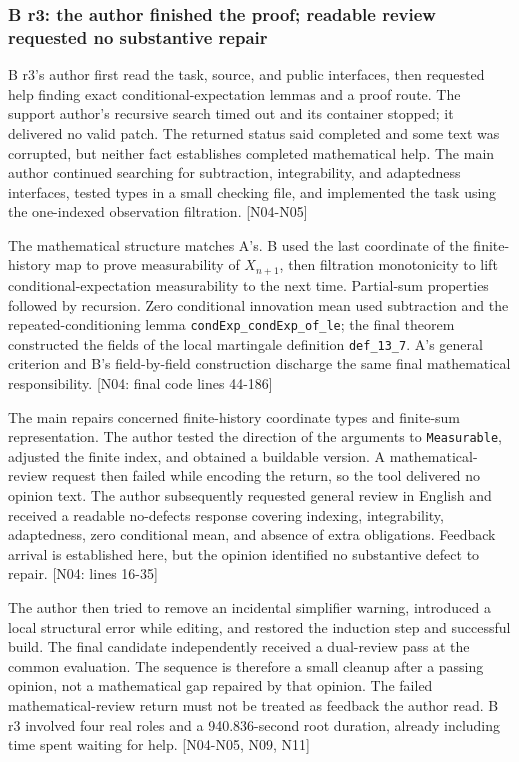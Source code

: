 \subsubsection[B r3: the author finished the proof; readable review requested no substantive repair]{\texorpdfstring{\protect\hypertarget{g9-1}{}B r3: the author finished the proof; readable review requested no substantive repair}{B r3: the author finished the proof; readable review requested no substantive repair}}
B r3's author first read the task, source, and public interfaces, then requested help finding exact conditional-expectation lemmas and a proof route. The support author's recursive search timed out and its container stopped; it delivered no valid patch. The returned status said completed and some text was corrupted, but neither fact establishes completed mathematical help. The main author continued searching for subtraction, integrability, and adaptedness interfaces, tested types in a small checking file, and implemented the task using the one-indexed observation filtration. [N04-N05]

The mathematical structure matches A's. B used the last coordinate of the finite-history map to prove measurability of $X_{n+1}$, then filtration monotonicity to lift conditional-expectation measurability to the next time. Partial-sum properties followed by recursion. Zero conditional innovation mean used subtraction and the repeated-conditioning lemma \nolinkurl{condExp_condExp_of_le}; the final theorem constructed the fields of the local martingale definition \nolinkurl{def_13_7}. A's general criterion and B's field-by-field construction discharge the same final mathematical responsibility. [N04: final code lines 44-186]

The main repairs concerned finite-history coordinate types and finite-sum representation. The author tested the direction of the arguments to \nolinkurl{Measurable}, adjusted the finite index, and obtained a buildable version. A mathematical-review request then failed while encoding the return, so the tool delivered no opinion text. The author subsequently requested general review in English and received a readable no-defects response covering indexing, integrability, adaptedness, zero conditional mean, and absence of extra obligations. Feedback arrival is established here, but the opinion identified no substantive defect to repair. [N04: lines 16-35]

The author then tried to remove an incidental simplifier warning, introduced a local structural error while editing, and restored the induction step and successful build. The final candidate independently received a dual-review pass at the common evaluation. The sequence is therefore a small cleanup after a passing opinion, not a mathematical gap repaired by that opinion. The failed mathematical-review return must not be treated as feedback the author read. B r3 involved four real roles and a 940.836-second root duration, already including time spent waiting for help. [N04-N05, N09, N11]

